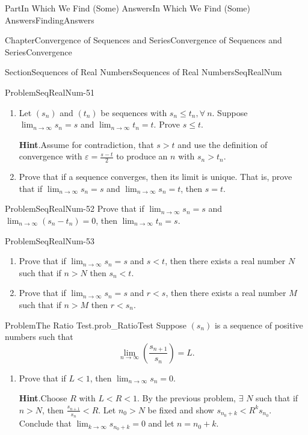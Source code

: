 \documentclass[oneside,10pt,]{book}
\newcommand{\blocktitlefont}{\relax}
\numberwithin{equation}{part}
\def\limit#1#2#3{{\displaystyle\lim_{#1\rightarrow #2}#3}}
\newcommand{\eps}{\varepsilon}
\newcommand{\lt}{<}
\begin{document}
\begin{partptx}{Part}{In Which We Find (Some) Answers}{}{In Which We Find (Some) Answers}{}{}{FindingAnswers}
\begin{chapterptx}{Chapter}{Convergence of Sequences and Series}{}{Convergence of Sequences and Series}{}{}{Convergence}
\begin{sectionptx}{Section}{Sequences of Real Numbers}{}{Sequences of Real Numbers}{}{}{SeqRealNum}
\begin{problem}{Problem}{}{SeqRealNum-51}
\begin{enumerate}[font=\bfseries,label=(\alph*),ref=\alph*]%
\item{}Let \(\left(s_n\right)\) and \(\left(t_n\right)\) be sequences with \(s_n\leq t_n,\forall\  n\).  Suppose \(\limit{n}{\infty}{s_n}=s\) and \(\limit{n}{\infty}{t_n}=t\). Prove \(s\leq t\).%
\par\smallskip%
\noindent\textbf{\blocktitlefont Hint}.\hypertarget{SeqRealNum-51-2-2}{}\quad{}Assume for contradiction, that \(s>t\) and use the definition of convergence with \(\eps=\frac{s-t}{2}\) to produce an \(n\) with \(s_n>t_n\).%
\item{}Prove that if a sequence converges, then its limit is unique.  That is, prove that if \(\limit{n}{\infty}{s_n}=s\) and \(\limit{n}{\infty}{s_n}=t\), then \(s=t\).%
\end{enumerate}%
\end{problem}
\begin{problem}{Problem}{}{SeqRealNum-52}%
Prove that if \(\limit{n}{\infty}{s_n}=s\) and \(\limit{n}{\infty}{\left(s_n-t_n\right)}=0\), then \(\limit{n}{\infty}{t_n}=s\).%
\end{problem}
\begin{problem}{Problem}{}{SeqRealNum-53}%
\begin{enumerate}[font=\bfseries,label=(\alph*),ref=\alph*]%
\item{}Prove that if \(\limit{n}{\infty}{s_n}=s\) and \(s\lt
t\), then there exists a real number \(N\) such that if \(n>N\) then \(s_n\lt t\).%
\item{}Prove that if \(\limit{n}{\infty}{s_n}=s\) and \(r\lt
s\), then there exists a real number \(M\) such that if \(n>M\) then \(r\lt s_n\).%
\end{enumerate}%
\end{problem}
\begin{problem}{Problem}{The Ratio Test.}{prob_RatioTest}%
Suppose \(\left(s_n\right)\) is a sequence of positive numbers such that%
\begin{equation*}
\limit{n}{\infty}{\left(\frac{s_{n+1}}{s_n}\right)}=L\text{.}
\end{equation*}
%
\begin{enumerate}[font=\bfseries,label=(\alph*),ref=\alph*]%
\item{}Prove that if \(L\lt 1\), then \(\limit{n}{\infty}{s_n}=0\).%
\par\smallskip%
\noindent\textbf{\blocktitlefont Hint}.\hypertarget{prob_RatioTest-4-2}{}\quad{}Choose \(R\) with \(L\lt R\lt 1\).  By the previous problem, \(\exists\) \(N\) such that if \(n>N\), then \(\frac{s_{n+1}}{s_n}\lt R\).  Let \(n_0>N\) be fixed and show \(s_{n_0+k}\lt R^ks_{n_0}\). Conclude that \(\limit{k}{\infty}{s_{n_0+k}}=0\) and let \(n=n_0+k\).%

\end{enumerate}
\end{problem}
\end{sectionptx}
\end{chapterptx}
\end{partptx}
\end{document}

